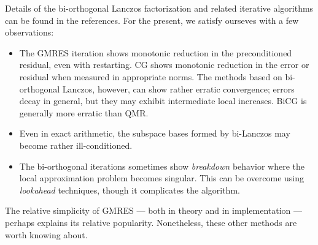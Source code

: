 Details of the bi-orthogonal Lanczos factorization and related
iterative algorithms can be found in the references.  For the present,
we satisfy ourseves with a few observations:
\begin{itemize}
\item
  The GMRES iteration shows monotonic reduction in the preconditioned
  residual, even with restarting.  CG shows monotonic reduction in the
  error or residual when measured in appropriate norms.  The methods
  based on bi-orthogonal Lanczos, however, can show rather erratic
  convergence; errors decay in general, but they may exhibit
  intermediate local increases.  BiCG is generally more erratic than
  QMR.
\item
  Even in exact arithmetic, the subspace bases formed by bi-Lanczos
  may become rather ill-conditioned.
\item
  The bi-orthogonal iterations sometimes show {\em breakdown} behavior
  where the local approximation problem becomes singular.  This can be
  overcome using {\em lookahead} techniques, though it complicates the
  algorithm.
\end{itemize}
The relative simplicity of GMRES --- both in theory and in implementation ---
perhaps explains its relative popularity.  Nonetheless, these other methods
are worth knowing about.
